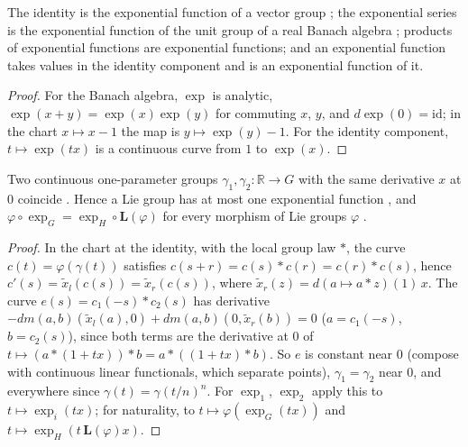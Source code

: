 \begin{proposition}
  \label{prop:exp-examples}
  \leanok
  The identity is the exponential function of a vector group \cite[Example 5.6.5]{GN26}; the
  exponential series is the exponential function of the unit group of a real Banach algebra
  \cite[Example 5.6.6]{GN26}; products of exponential functions are exponential functions; and an
  exponential function takes values in the identity component and is an exponential function of
  it.
\end{proposition}

\begin{proof}
  \leanok
  For the Banach algebra, $\exp$ is analytic, $\exp(x + y) = \exp(x)\exp(y)$ for commuting $x$,
  $y$, and $d\exp(0) = \mathrm{id}$; in the chart $x \mapsto x - 1$ the map is $y \mapsto \exp(y) - 1$.
  For the identity component, $t \mapsto \exp(tx)$ is a continuous curve from $1$ to $\exp(x)$.
\end{proof}

\begin{theorem}
  \label{thm:exp-unique}
  \leanok
  Two continuous one-parameter groups $\gamma_1, \gamma_2 \colon \mathbb{R} \to G$ with the same
  derivative $x$ at $0$ coincide \cite[Remark 5.6.4, Lemma 5.5.4]{GN26}. Hence a Lie group has at
  most one exponential function \cite[Proposition 5.6.3]{GN26}, and
  $\varphi \circ \exp_G = \exp_H \circ \mathbf{L}(\varphi)$ for every morphism of Lie groups
  $\varphi$ \cite[Proposition 5.6.12]{GN26}.
\end{theorem}

\begin{proof}
  \leanok
  In the chart at the identity, with the local group law $*$, the curve $c(t) = \varphi(\gamma(t))$
  satisfies $c(s + r) = c(s) * c(r) = c(r) * c(s)$, hence $c'(s) = \tilde x_l(c(s)) =
  \tilde x_r(c(s))$, where $\tilde x_r(z) = d(a \mapsto a * z)(1)\,x$. The curve
  $e(s) = c_1(-s) * c_2(s)$ has derivative
  $-dm(a, b)(\tilde x_l(a), 0) + dm(a, b)(0, \tilde x_r(b)) = 0$ ($a = c_1(-s)$, $b = c_2(s)$),
  since both terms are the derivative at $0$ of $t \mapsto (a * (1 + tx)) * b = a * ((1 + tx) * b)$.
  So $e$ is constant near $0$ (compose with continuous linear functionals, which separate points),
  $\gamma_1 = \gamma_2$ near $0$, and everywhere since $\gamma(t) = \gamma(t/n)^n$. For
  $\exp_1$, $\exp_2$ apply this to $t \mapsto \exp_i(tx)$; for naturality, to
  $t \mapsto \varphi(\exp_G(tx))$ and $t \mapsto \exp_H(t\,\mathbf{L}(\varphi)x)$.
\end{proof}

